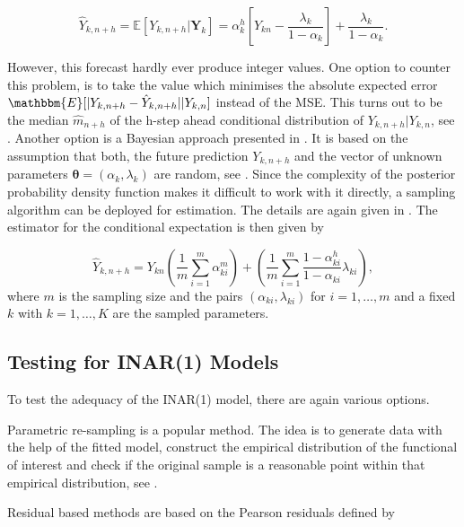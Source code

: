 \begin{equation}
\hat{Y}_{k,n+h} = \mathbb{E}[Y_{k,n+h} | \bm{Y}_k] = \alpha_k^h \left[Y_{kn}- \frac{\lambda_k}{1-\alpha_k} \right] + \frac{\lambda_k}{1-\alpha_k}.
\label{eq:Forecasting Classic}
\end{equation}


However, this forecast hardly ever produce integer values. One option to counter this problem, is to take the value which minimises the absolute expected error $\mathbbm{E}[\abs{Y_{k,n+h} - \hat{Y}_{k,n+h}}|Y_{k,n}]$ instead of the MSE. This turns out to be the median $\hat{m}_{n+h}$ of the h-step ahead conditional distribution of $Y_{k,n+h}|Y_{k,n}$, see \textcite{Silva:2005,Freeland:2004}. Another option is a Bayesian approach presented in \textcite{Silva:2005}. It is based on the assumption that both, the future prediction $Y_{k,n+h}$ and the vector of unknown parameters $\bm{\theta}=(\alpha_k,\lambda_k)$ are random, see \textcite{Silva:2005}. Since the complexity of the posterior probability density function makes it difficult to work with it directly, a sampling algorithm can be deployed for estimation. The details are again given in \textcite{Silva:2005}. The estimator for the conditional expectation is then given by

\begin{equation}
\hat{Y}_{k,n+h}= Y_{kn}\left(\frac{1}{m} \sum_{i=1}^m\alpha_{ki}^m\right) + \left(\frac{1}{m} \sum_{i=1}^m \frac{1-\alpha_{ki}^h}{1-\alpha_{ki}}\lambda_{ki}\right),
\label{eq:Forecasting Bayesian}
\end{equation}
%
where $m$ is the sampling size and the pairs $(\alpha_{ki},\lambda_{ki})$ for $i=1,\ldots,m$ and a fixed $k$ with $k=1,\ldots,K$ are the sampled parameters. 

\subsection{Testing for INAR(1) Models}
\label{sec:Testing for INAR(1) Models}

To test the adequacy of the INAR(1) model, there are again various options. 

Parametric re-sampling is a popular method. The idea is to generate data with the help of the fitted model, construct the empirical distribution of the functional of interest and check if the original sample is a reasonable point within that empirical distribution, see \textcite{Silva:2005}. 

Residual based methods are based on the Pearson residuals defined by 

